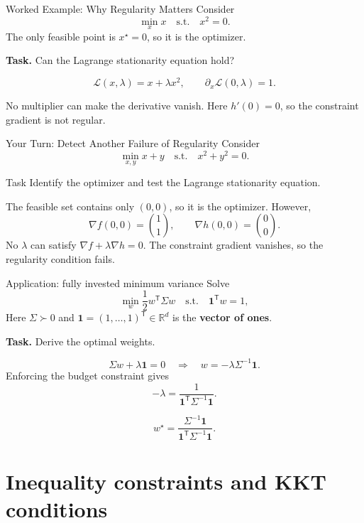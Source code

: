 \documentclass[aspectratio=169,11pt]{beamer}
\newcommand{\R}{\mathbb{R}}
\newcommand{\trans}{^{\mathsf T}}
\newcommand{\grad}{\nabla}
\begin{document}
\begin{frame}{Worked Example: Why Regularity Matters}
  Consider
  \[
    \min_x x
    \quad\text{s.t.}\quad x^2=0.
  \]
  The only feasible point is $x^\star=0$, so it is the optimizer.

  \textbf{Task.} Can the Lagrange stationarity equation hold?

  \pause
  \[
    \mathcal L(x,\lambda)=x+\lambda x^2,
    \qquad
    \partial_x\mathcal L(0,\lambda)=1.
  \]

  \pause
  No multiplier can make the derivative vanish. Here $h'(0)=0$, so the constraint
  gradient is not regular.
\end{frame}

\begin{frame}{Your Turn: Detect Another Failure of Regularity}
  Consider
  \[
    \min_{x,y}x+y
    \quad\text{s.t.}\quad x^2+y^2=0.
  \]
  \begin{exampleblock}{Task}
    Identify the optimizer and test the Lagrange stationarity equation.
  \end{exampleblock}

  \pause
  The feasible set contains only $(0,0)$, so it is the optimizer. However,
  \[
    \grad f(0,0)=\binom11,
    \qquad
    \grad h(0,0)=\binom00.
  \]
  No $\lambda$ can satisfy $\grad f+\lambda\grad h=0$. The constraint
  gradient vanishes, so the regularity condition fails.
\end{frame}

\begin{frame}{Application: fully invested minimum variance}
  Solve
  \[
    \min_w \frac12w\trans\Sigma w
    \quad\text{s.t.}\quad \mathbf1\trans w=1,
  \]
  Here $\Sigma\succ0$ and $\mathbf1=(1,\ldots,1)\trans\in\R^d$ is the
  \textbf{vector of ones}.

  \textbf{Task.} Derive the optimal weights.

  \pause
  \[
    \Sigma w+\lambda\mathbf1=0
    \quad\Longrightarrow\quad
    w=-\lambda\Sigma^{-1}\mathbf1.
  \]
  Enforcing the budget constraint gives
  \[
    -\lambda=\frac{1}{\mathbf1\trans\Sigma^{-1}\mathbf1}.
  \]

  \pause
  \[
    \boxed{w^\star=
    \frac{\Sigma^{-1}\mathbf1}
    {\mathbf1\trans\Sigma^{-1}\mathbf1}.}
  \]
\end{frame}

\section{Inequality constraints and KKT conditions}
\end{document}
